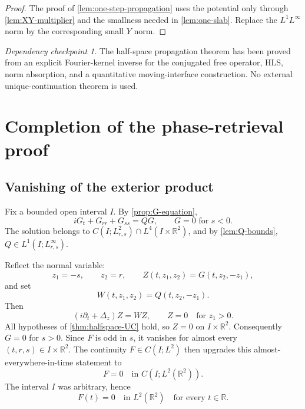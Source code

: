 \documentclass[11pt,oneside]{book}
\theoremstyle{definition}
\theoremstyle{remark}
\newtheorem{checkpoint}[theorem]{Dependency checkpoint}
\newcommand{\R}{\mathbb R}
\newcommand{\1}{\mathbf 1}
\begin{document}
\begin{proof}
The proof of \cref{lem:one-step-propagation} uses the potential only through
\cref{lem:XY-multiplier} and the smallness needed in
\cref{lem:one-slab}.  Replace the $L^1L^\infty$ norm by the corresponding
small $Y$ norm.
\end{proof}

\begin{checkpoint}
The half-space propagation theorem has been proved from an explicit
Fourier-kernel inverse for the conjugated free operator, HLS, norm
absorption, and a quantitative moving-interface construction.  No external
unique-continuation theorem is used.
\end{checkpoint}

\chapter{Completion of the phase-retrieval proof}\label{chap:completion}

\section{Vanishing of the exterior product}
Fix a bounded open interval $I$.  By \cref{prop:G-equation},
\[
 iG_t+G_{rr}+G_{ss}=QG,
 \qquad G=0\text{ for }s<0.
\]
The solution belongs to
$C(I;L^2_{r,s})\cap L^4(I\times\R^2)$, and by
\cref{lem:Q-bounds},
$Q\in L^1(I;L^\infty_{r,s})$.

Reflect the normal variable:
\begin{equation}
 z_1=-s,\qquad z_2=r,
 \qquad Z(t,z_1,z_2)=G(t,z_2,-z_1),                 \label{eq:Z-reflection}
\end{equation}
and set
\[
 W(t,z_1,z_2)=Q(t,z_2,-z_1).
\]
Then
\[
 (i\partial_t+\Delta_z)Z=WZ,
 \qquad Z=0\quad\text{for }z_1>0.
\]
All hypotheses of \cref{thm:halfspace-UC} hold, so $Z=0$ on
$I\times\R^2$.  Consequently $G=0$ for $s>0$.  Since $F$ is odd in $s$, it
vanishes for almost every $(t,r,s)\in I\times\R^2$.  The continuity
$F\in C(I;L^2)$ then upgrades this almost-everywhere-in-time statement to
\begin{equation}
  F=0\quad\text{in }C(I;L^2(\R^2)).                \label{eq:F-zero-I}
\end{equation}
The interval $I$ was arbitrary, hence
\begin{equation}
  F(t)=0\quad\text{in }L^2(\R^2)
  \quad\text{for every }t\in\R.                   \label{eq:F-zero-all}
\end{equation}
\end{document}
